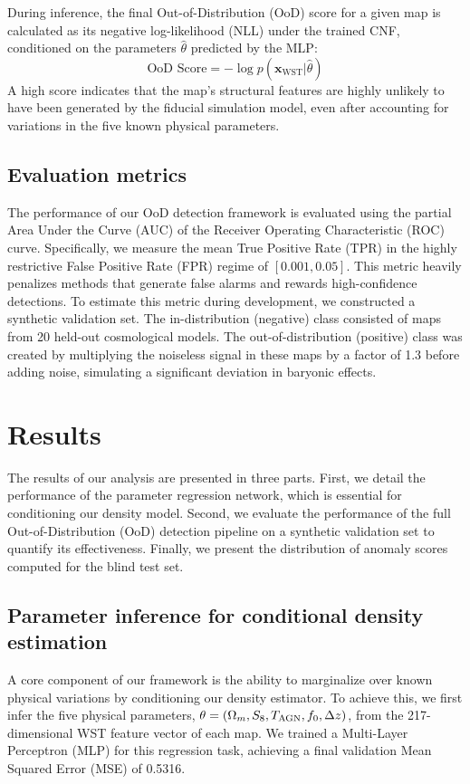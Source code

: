 \documentclass[]{article}
\begin{document}
During inference, the final Out-of-Distribution (OoD) score for a given map is calculated as its negative log-likelihood (NLL) under the trained CNF, conditioned on the parameters $\hat{\theta}$ predicted by the MLP:
\begin{equation}
    \text{OoD Score} = - \log p(\mathbf{x}_{\text{WST}} | \hat{\theta})
\end{equation}
A high score indicates that the map's structural features are highly unlikely to have been generated by the fiducial simulation model, even after accounting for variations in the five known physical parameters.

\subsection{Evaluation metrics}
The performance of our OoD detection framework is evaluated using the partial Area Under the Curve (AUC) of the Receiver Operating Characteristic (ROC) curve. Specifically, we measure the mean True Positive Rate (TPR) in the highly restrictive False Positive Rate (FPR) regime of $[0.001, 0.05]$. This metric heavily penalizes methods that generate false alarms and rewards high-confidence detections. To estimate this metric during development, we constructed a synthetic validation set. The in-distribution (negative) class consisted of maps from 20 held-out cosmological models. The out-of-distribution (positive) class was created by multiplying the noiseless signal in these maps by a factor of 1.3 before adding noise, simulating a significant deviation in baryonic effects.

\section{Results}
\label{sec:results}
The results of our analysis are presented in three parts. First, we detail the performance of the parameter regression network, which is essential for conditioning our density model. Second, we evaluate the performance of the full Out-of-Distribution (OoD) detection pipeline on a synthetic validation set to quantify its effectiveness. Finally, we present the distribution of anomaly scores computed for the blind test set.

\subsection{Parameter inference for conditional density estimation}
A core component of our framework is the ability to marginalize over known physical variations by conditioning our density estimator. To achieve this, we first infer the five physical parameters, $\theta = (\Omega_m, S_8, T_{\rm AGN}, f_0, \Delta z)$, from the 217-dimensional WST feature vector of each map. We trained a Multi-Layer Perceptron (MLP) for this regression task, achieving a final validation Mean Squared Error (MSE) of 0.5316. 
\end{document}
